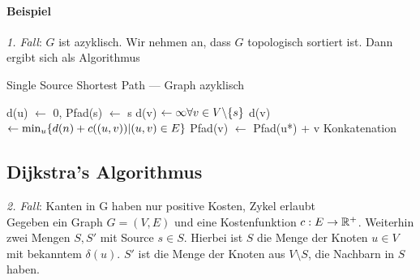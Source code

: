                 \paragraph{Beispiel}
                    \emph{1. Fall}: $G$ ist azyklisch. Wir nehmen an, dass $G$ topologisch sortiert ist.  Dann ergibt sich als Algorithmus
                    
                    \begin{algorithm}
                    	\caption{Single Source Shortest Path --- Graph azyklisch}
                    	\label{alg:sssp1}
                    	\begin{algorithmic}
                    		\State d(u) $\gets$ 0, Pfad(s) $\gets$ s
                    		\State d(v) $\gets \infty \forall v\in V\backslash \{s\}$
                    			\State d(v) $\gets \min_u\{d(n)+c((u,v)) | (u,v)\in E\}$
                    			\State Pfad(v) $\gets$ Pfad(u*) + v \Comment Konkatenation
                    		\EndFor
                    	\end{algorithmic}
                    \end{algorithm}
                    

            \subsection{Dijkstra's Algorithmus}
						\emph{2. Fall}: Kanten in G haben nur positive Kosten, Zykel erlaubt\\
            Gegeben ein Graph $G = (V, E)$ und eine Kostenfunktion $c: E \to \mathbb{R}^+$.
            Weiterhin zwei Mengen $S, S'$ mit Source $s \in S$. Hierbei ist $S$ die Menge der Knoten $u \in V$ mit bekanntem $\delta(u)$. $S'$ ist die Menge der Knoten aus $V \setminus S$, die Nachbarn in $S$ haben.

